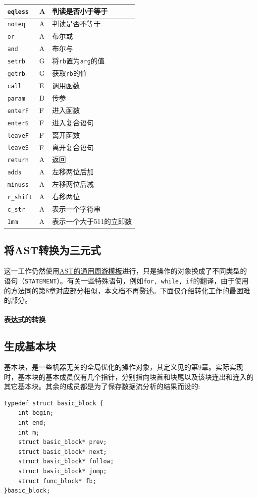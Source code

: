 \begin{center}
\begin{minipage}{0.48\textwidth}
\begin{flushright}
\begin{tabular}{|l|l|l|}
	\hline
		\verb|eqless| & A & 判读是否小于等于\\
	\hline 
		\verb|noteq| & A & 判读是否不等于\\
	\hline 
		\verb|or| & A & 布尔或\\
	\hline 
		\verb|and| & A & 布尔与\\
	\hline 
		\verb|setrb| & G & 将\verb|rb|置为\verb|arg|的值\\
	\hline 
		\verb|getrb| & G & 获取\verb|rb|的值\\
	\hline 
		\verb|call| & E & 调用函数\\
	\hline 
		\verb|param| & D & 传参\\
	\hline 
		\verb|enterF| & F & 进入函数\\
	\hline 
		\verb|enterS| & F & 进入复合语句\\
	\hline 
		\verb|leaveF| & F & 离开函数\\
	\hline 
		\verb|leaveS| & F & 离开复合语句\\
	\hline 
		\verb|return| & A & 返回\\
	\hline
		\verb|adds| & A & 左移两位后加\\
	\hline
		\verb|minuss| & A & 左移两位后减\\
	\hline 
		\verb|r_shift| & A & 右移两位\\
	\hline 
		\verb|c_str| & A & 表示一个字符串\\
	\hline
		\verb|Imm| & A & 表示一个大于511的立即数\\
	\hline
	\end{tabular}
\end{flushright}
\end{minipage}
\end{center}
\subsection{将AST转换为三元式}
这一工作仍然使用\hyperref[ASTtravesal]{AST的通用周游模板}进行，只是操作的对象换成了不同类型的语句（\verb|STATEMENT|）。有关一些特殊语句，例如\verb|for, while, if|的翻译，由于使用的方法同\cite{sunjiasu}的第8章对应部分相似，本文档不再赘述。下面仅介绍转化工作的最困难的部分。
\paragraph*{表达式的转换}
\label{ASTtotriple}
\subsection{生成基本块}
\label{basicblock}
基本块，是一些机器无关的全局优化的操作对象，其定义见\cite{sunjiasu}的第9章。实际实现时，基本块的基本成员仅有几个指针，分别指向块首和块尾以及该块连出和连入的其它基本块。其余的成员都是为了保存数据流分析的结果而设的:
\begin{lstlisting}
typedef struct basic_block {
	int begin;
	int end;
	int m;
	struct basic_block* prev;
	struct basic_block* next;
	struct basic_block* follow;
	struct basic_block* jump;
	struct func_block* fb;
}basic_block;
\end{lstlisting}

